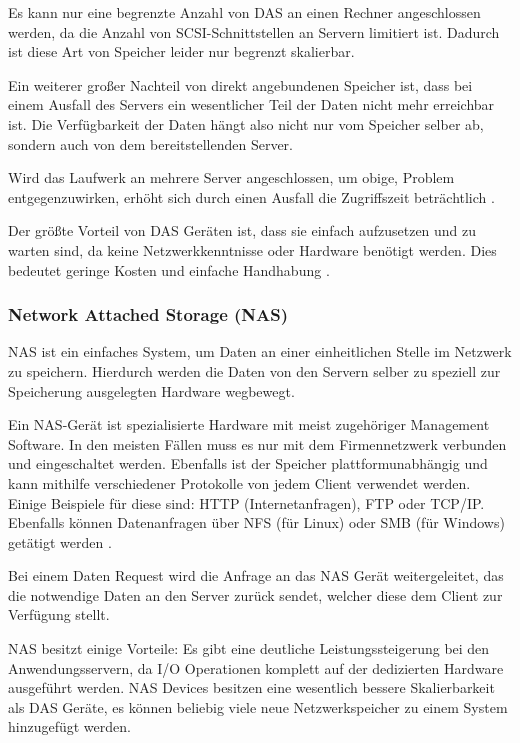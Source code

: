 Es kann nur eine begrenzte Anzahl von \ac{DAS} an einen Rechner angeschlossen werden, da die Anzahl von SCSI-Schnittstellen an Servern limitiert ist. Dadurch ist diese Art von Speicher leider nur begrenzt skalierbar.

Ein weiterer großer Nachteil von direkt angebundenen Speicher ist, dass bei einem Ausfall des Servers ein wesentlicher Teil der Daten nicht mehr erreichbar ist. Die Verfügbarkeit der Daten hängt also nicht nur vom Speicher selber ab, sondern auch von dem bereitstellenden Server.

Wird das Laufwerk an mehrere Server angeschlossen, um obige, Problem entgegenzuwirken, erhöht sich durch einen Ausfall die Zugriffszeit beträchtlich \parencite[Kap. 1, Disk Storage Systems]{gupta.2002}.

Der größte Vorteil von DAS Geräten ist, dass sie einfach aufzusetzen und zu warten sind, da keine Netzwerkkenntnisse oder Hardware benötigt werden. Dies bedeutet geringe Kosten und einfache Handhabung \parencite{beal.2017}.

\subsubsection{Network Attached Storage (NAS)}

\ac{NAS} ist ein einfaches System, um Daten an einer einheitlichen Stelle im Netzwerk zu speichern. Hierdurch werden die Daten von den Servern selber zu speziell zur Speicherung ausgelegten Hardware wegbewegt. 

Ein NAS-Gerät ist spezialisierte Hardware mit meist zugehöriger Management Software. In den meisten Fällen muss es nur mit dem Firmennetzwerk verbunden und eingeschaltet werden. Ebenfalls ist der Speicher plattformunabhängig und kann mithilfe verschiedener Protokolle von jedem Client verwendet werden. Einige Beispiele für diese sind: HTTP (Internetanfragen), FTP oder TCP/IP. Ebenfalls können Datenanfragen über NFS (für Linux) oder SMB (für Windows) getätigt werden \parencite[Kap. 1, NAS Devices]{gupta.2002}.

Bei einem Daten Request wird die Anfrage an das NAS Gerät weitergeleitet, das die notwendige Daten an den Server zurück sendet, welcher diese dem Client zur Verfügung stellt.

NAS besitzt einige Vorteile: Es gibt eine deutliche Leistungssteigerung bei den Anwendungsservern, da I/O Operationen komplett auf der dedizierten Hardware ausgeführt werden. NAS Devices besitzen eine wesentlich bessere Skalierbarkeit als \ac{DAS} Geräte, es können beliebig viele neue Netzwerkspeicher zu einem System hinzugefügt werden.

